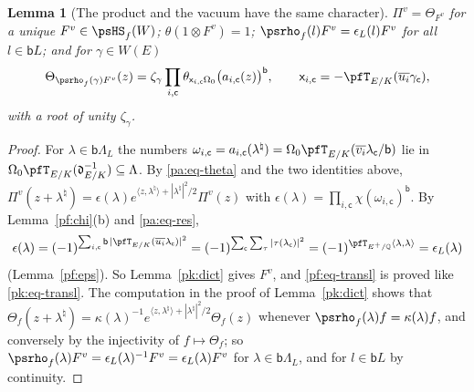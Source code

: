 \documentclass[10pt]{amsart}
\newtheorem{lemma}[theorem]{Lemma}
\theoremstyle{definition}
\theoremstyle{remark}
\newcommand{\Q}{\mathbb Q}
\providecommand{\aubar}[1]{\overline{#1}}
\begin{document}
\begin{lemma}[The product and the vacuum have the same character]\label{pf:semi}
$\Pi^v=\Theta_{F^v}$ for a unique $F^v\in\psHS_f(W)$; $\theta(1\otimes F^v)=1$;
$\psrho_f(l)F^v=\epsilon_L(l)F^v$ for all $l\in\mathsf bL$; and for $\gamma\in W(E)$
\begin{equation}\label{pf:eq-transl}
\Theta_{\psrho_f(\gamma)F^v}(z)=\zeta_\gamma\prod_{i,\mathsf c}\theta_{\mathsf x_{i,\mathsf c}
\Omega_0}\bigl(a_{i,\mathsf c}(z)\bigr)^{\mathsf b},\qquad\mathsf x_{i,\mathsf c}=-\pfT_{E/K}(
\aubar{u_i}\gamma_{\mathsf c}),
\end{equation}
with a root of unity $\zeta_\gamma$.
\end{lemma}
\begin{proof}
For $\lambda\in\mathsf b\Lambda_L$ the numbers $\omega_{i,\mathsf c}=a_{i,\mathsf c}(\lambda^\natural)
=\Omega_0\pfT_{E/K}(\aubar{v_i}\lambda_{\mathsf c}/\mathsf b)$ lie in $\Omega_0\pfT_{E/K}(\mathfrak
d_{E/K}^{-1})\subseteq\Lambda$. By \eqref{pa:eq-theta} and the two identities above,
$\Pi^v(z+\lambda^\natural)=\epsilon(\lambda)e^{\langle z,\lambda^\natural\rangle+|\lambda^\natural
|^2/2}\Pi^v(z)$ with $\epsilon(\lambda)=\prod_{i,\mathsf c}\chi(\omega_{i,\mathsf c})^{\mathsf b}$.
By Lemma~\ref{pf:chi}(b) and \eqref{pa:eq-res},
\[
\epsilon(\lambda)=(-1)^{\sum_{i,\mathsf c}\mathsf b\,|\pfT_{E/K}(\aubar{u_i}\lambda_{\mathsf c})|^2}
=(-1)^{\sum_{\mathsf c}\sum_\tau|\tau(\lambda_{\mathsf c})|^2}=(-1)^{\pfT_{E^+/\Q}\langle\lambda,
\lambda\rangle}=\epsilon_L(\lambda)
\]
(Lemma~\ref{pf:eps}). So Lemma~\ref{pk:dict} gives $F^v$, and \eqref{pf:eq-transl} is proved like
\eqref{pk:eq-transl}. The computation in the proof of Lemma~\ref{pk:dict} shows that
$\Theta_f(z+\lambda^\natural)=\kappa(\lambda)^{-1}e^{\langle z,\lambda^\natural\rangle+|\lambda^
\natural|^2/2}\Theta_f(z)$ whenever $\psrho_f(\lambda)f=\kappa(\lambda)f$, and conversely by the
injectivity of $f\mapsto\Theta_f$; so $\psrho_f(\lambda)F^v=\epsilon_L(\lambda)^{-1}F^v=\epsilon_L
(\lambda)F^v$ for $\lambda\in\mathsf b\Lambda_L$, and for $l\in\mathsf bL$ by continuity.
\end{proof}
\end{document}
